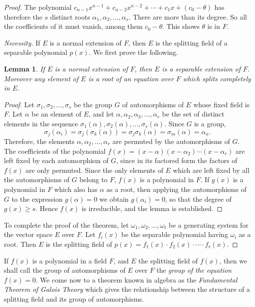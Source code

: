 \documentclass[10pt,leqno]{article}
\newtheorem*{lemm*}{Lemma}
\theoremstyle{definition}
\begin{document}
\begin{proof}
The polynomial $c_{n-1}x^{n-1} + c_{n-2}x^{n-2} + \cdots + c_1 x + (c_0 - \theta)$ has therefore the $s$ distinct roots $\alpha_1,\alpha_2,\ldots,\alpha_s$.
There are more than its degree.
So all the coefficients of it must vanish, among them $c_0 - \theta$.
This shows $\theta$ is in $F$.

\emph{Necessity.}\quad
If $E$ is a normal extension of $F$, then $E$ is the splitting field of a separable polynomial $p(x)$.
We first prove the following.

\begin{lemm*}
If $E$ is a normal extension of $F$, then $E$ is a separable extension of $F$.
Moreover any element of $E$ is a root of an equation over $F$ which splits completely in $E$.
\end{lemm*}

\begin{proof}
Let $\sigma_1,\sigma_2, \ldots,\sigma_s$ be the group $G$ of automorphisms of $E$ whose fixed field is $F$.
Let $\alpha$ be an element of $E$, and let $\alpha, \alpha_2, \alpha_3, \ldots, \alpha_r$ be the set of distinct elements in the sequence $\sigma_1(\alpha), \sigma_2(\alpha), \ldots, \sigma_s(\alpha)$.
Since $G$ is a group,
\[
\sigma_j(\alpha_i)
= \sigma_j(\sigma_k(\alpha))
= \sigma_j \sigma_k(\alpha)
= \sigma_m(\alpha)
= \alpha_n.
\]
Therefore, the elements $\alpha, \alpha_2, \ldots, \alpha_r$ are permuted by the automorphisms of $G$.
The coefficients of the polynomial $f(x) = (x-\alpha)(x-\alpha_2) \cdots (x-\alpha_r)$ are left fixed by each automorphism of $G$, since in its factored form the factors of $f(x)$ are only permuted.
Since the only elements of $E$ which are left fixed by all the automorphisms of $G$ belong to $F$, $f(x)$ is a polynomial in $F$.
If $g(x)$ is a polynomial in $F$ which also has $\alpha$ as a root, then applying the automorphisms of $G$ to the expression $g(\alpha) = 0$ we obtain $g(\alpha_i) = 0$, so that the degree of $g(x) \geq s$.
Hence $f(x)$ is irreducible, and the lemma is established.
\end{proof}

To complete the proof of the theorem, let $\omega_1,\omega_2, \ldots, \omega_t$ be a generating system for the vector space $E$ over $F$.
Let $f_i(x)$ be the separable polynomial having $\omega_i$ as a root.
Then $E$ is the splitting field of $p(x) = f_1(x) \cdot f_2(x) \cdot \cdots \cdot f_r(x)$.
\end{proof}


If $f(x)$ is a polynomial in a field $F$, and $E$ the splitting field of $f(x)$, then we shall call the group of automorphisms of $E$ over $F$ the \emph{group of the equation $f(x) = 0$}.
We come now to a theorem known in algebra as the \emph{Fundamental Theorem of Galois Theory} which gives the relationship between the structure of a splitting field and its group of automorphisms.
\end{document}
